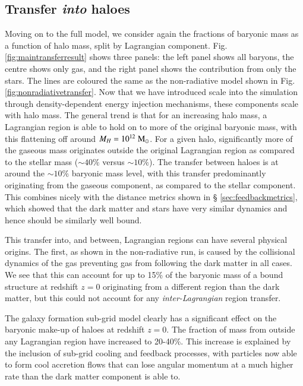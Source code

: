 \subsection{Transfer \emph{into} haloes}
\label{sec:transferinto}

Moving on to the full \simba{} model, we consider again the fractions of
baryonic mass as a function of halo mass, split by Lagrangian component. Fig.
\ref{fig:maintransferresult} shows three panels: the left panel shows all
baryons, the centre shows only gas, and the right panel shows the
contribution from only the stars. The lines are coloured the same as the
non-radiative model shown in Fig. \ref{fig:nonradiativetransfer}. Now that we
have introduced scale into the simulation through density-dependent energy
injection mechanisms, these components scale with halo mass. The general
trend is that for an increasing halo mass, a Lagrangian region is able to
hold on to more of the original baryonic mass, with this flattening off
around $M_H = 10^{12} \;{\rm M}_{\odot}$. For a given halo, significantly more of the
gaseous mass originates outside the original Lagrangian region as compared to
the stellar mass ($\sim 40 \%$ versus $\sim 10 \%$). The transfer between
haloes is at around the $\sim 10\%$ baryonic mass level, with this transfer
predominantly originating from the gaseous component, as compared to the
stellar component. This combines nicely with the distance metrics shown in \S
\ref{sec:feedbackmetrics}, which showed that the dark matter and stars have
very similar dynamics and hence should be similarly well bound.

This transfer into, and between, Lagrangian regions can have several physical
origins. The first, as shown in the non-radiative run, is caused by the
collisional dynamics of the gas preventing gas from following the dark matter
in all cases. We see that this can account for up to 15\% of the baryonic
mass of a bound structure at redshift $z=0$ originating from a different
region than the dark matter, but this could not account for any
\emph{inter-Lagrangian} region transfer.

The galaxy formation sub-grid model clearly has a significant effect on the
baryonic make-up of haloes at redshift $z=0$. The fraction of mass from
outside any Lagrangian region have increased to 20-40\%. This increase is
explained by the inclusion of sub-grid cooling and feedback processes, with
particles now able to form cool accretion flows that can lose angular
momentum at a much higher rate than the dark matter component is able to.

